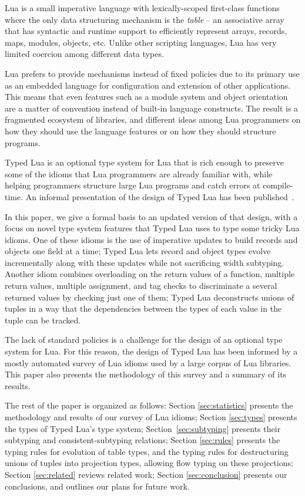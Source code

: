 \documentclass{sigplanconf}
\begin{document}
Lua is a small imperative language with lexically-scoped first-class functions where the only data structuring
mechanism is the \emph{table} --
an associative array that has syntactic and runtime support
to efficiently represent arrays, records, maps, modules,
objects, etc. Unlike other scripting languages, Lua has very limited coercion among different data types.

Lua prefers to provide mechanisms instead of fixed policies due
to its primary use as an embedded language for configuration and
extension of other applications.
This means that even features such as a module system and
object orientation are a matter of convention instead of
built-in language constructs.
The result is a fragmented ecosystem of libraries, and different
ideas among Lua programmers on how they should use the language
features or on how they should structure programs.

Typed Lua is an optional type system for
Lua that is rich enough to preserve some of the idioms
that Lua programmers are already familiar with, while
helping programmers structure large Lua programs and
catch errors at compile-time. An informal
presentation of the design of Typed Lua has been
published~\cite{maidl2014tl}.

In this paper, we give a formal basis to an updated version of that design, with a focus on novel type system features
that Typed Lua uses to type some tricky Lua idioms.
One of these idioms is the use of imperative updates to
build records and objects one field at a time; Typed Lua
lets record and object types evolve incrementally along
with these updates while not sacrificing width subtyping.
Another idiom combines overloading on the return values
of a function, multiple return values, multiple assignment,
and tag checks to discriminate a several returned values
by checking just one of them; Typed Lua deconstructs unions
of tuples in a way that the dependencies between the types
of each value in the tuple can be tracked.

The lack of standard policies is a challenge for the design of
an optional type system for Lua. For this reason, the design
of Typed Lua has been informed by a mostly automated survey
of Lua idioms used by a large corpus of Lua libraries.
This paper also presents the methodology of this survey and
a summary of its results.

The rest of the paper is organized as follows:
Section \ref{sec:statistics} presents the methodology and results of
our survey of Lua idioms;
Section \ref{sec:types} presents the types of Typed Lua's
type system; Section~\ref{sec:subtyping} presents
their subtyping and consistent-subtyping relations;
Section \ref{sec:rules} presents the typing rules for evolution of table types,
and the typing rules for destructuring unions of tuples into projection types,
allowing flow typing on these projections;
Section \ref{sec:related} reviews related work;
Section \ref{sec:conclusion} presents our conclusions,
and outlines our plans for future work.
\end{document}
